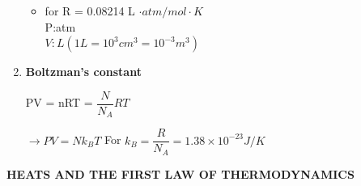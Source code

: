 \documentclass[10pt]{article}
\begin{document}
\begin{enumerate}
\begin{itemize}
	\item for R = 0.08214 L $\cdot atm/mol \cdot K$\\
	    P:atm\\
	    $V:L(1L = 10^3 cm^3 = 10^{-3} m^3)$\\
	\end{itemize}
	\item \textbf{Boltzman's constant}
      \begin{mybox}
	\begin{center}
	PV = nRT = $\dfrac{N}{N_A} RT$\\
       \end{center}
       \end{mybox}
	$\rightarrow{PV = Nk_BT}$
	For $k_B = \dfrac{R}{N_A} = 1.38 \times 10^{-23} J/K$ 
\end{enumerate}
\pagebreak
\begin{center}
\textbf{HEATS AND THE FIRST LAW OF THERMODYNAMICS}
\end{center}
\end{document}
